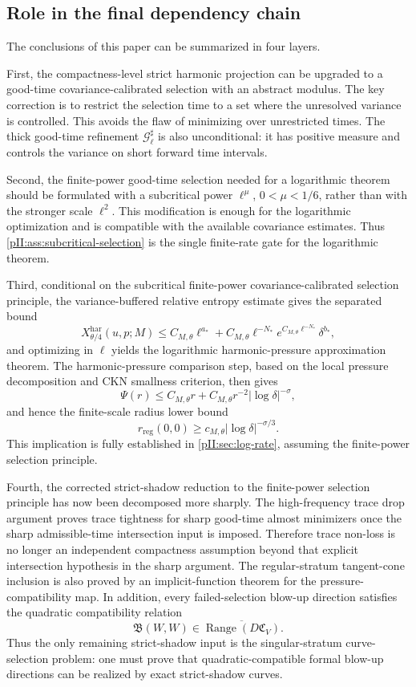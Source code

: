 \documentclass[11pt]{article}
\numberwithin{equation}{section}
\theoremstyle{plain}
\theoremstyle{definition}
\theoremstyle{remark}
\newcommand{\reg}{\mathrm{reg}}
\newcommand{\har}{\mathrm{har}}
\begin{document}
\subsection{Role in the final dependency chain}\label{pII:sec:status}

The conclusions of this paper can be summarized in four layers.

First, the compactness-level strict harmonic projection can be upgraded to a good-time covariance-calibrated selection with an abstract modulus.  The key correction is to restrict the selection time to a set where the unresolved variance is controlled.  This avoids the flaw of minimizing over unrestricted times.  The thick good-time refinement $\mathcal G_\ell^\sharp$ is also unconditional: it has positive measure and controls the variance on short forward time intervals.

Second, the finite-power good-time selection needed for a logarithmic theorem should be formulated with a subcritical power $\ell^\mu$, $0<\mu<1/6$, rather than with the stronger scale $\ell^2$.  This modification is enough for the logarithmic optimization and is compatible with the available covariance estimates.  Thus \cref{pII:ass:subcritical-selection} is the single finite-rate gate for the logarithmic theorem.

Third, conditional on the subcritical finite-power covariance-calibrated selection principle, the variance-buffered relative entropy estimate gives the separated bound
\[
        X^{\har}_{\theta/4}(u,p;M)
        \le C_{M,\theta}\ell^{a_*}
        +C_{M,\theta}\ell^{-N_*}e^{C_{M,\theta}\ell^{-N_*}}\delta^{b_*},
\]
and optimizing in $\ell$ yields the logarithmic harmonic-pressure approximation theorem.  The harmonic-pressure comparison step, based on the local pressure decomposition and CKN smallness criterion, then gives
\[
        \Psi(r)\le C_{M,\theta}r+C_{M,\theta}r^{-2}|\log\delta|^{-\sigma},
\]
and hence the finite-scale radius lower bound
\[
        r_{\reg}(0,0)\ge c_{M,\theta}|\log\delta|^{-\sigma/3}.
\]
This implication is fully established in \cref{pII:sec:log-rate}, assuming the finite-power selection principle.

Fourth, the corrected strict-shadow reduction to the finite-power selection principle has now been decomposed more sharply.  The high-frequency trace drop argument proves trace tightness for sharp good-time almost minimizers once the sharp admissible-time intersection input is imposed.  Therefore trace non-loss is no longer an independent compactness assumption beyond that explicit intersection hypothesis in the sharp argument.  The regular-stratum tangent-cone inclusion is also proved by an implicit-function theorem for the pressure-compatibility map.  In addition, every failed-selection blow-up direction satisfies the quadratic compatibility relation
\[
        \mathfrak B(W,W)
        \in \overline{\operatorname{Range}(D\mathfrak C_V)}.
\]
Thus the only remaining strict-shadow input is the singular-stratum curve-selection problem: one must prove that quadratic-compatible formal blow-up directions can be realized by exact strict-shadow curves.
\end{document}
